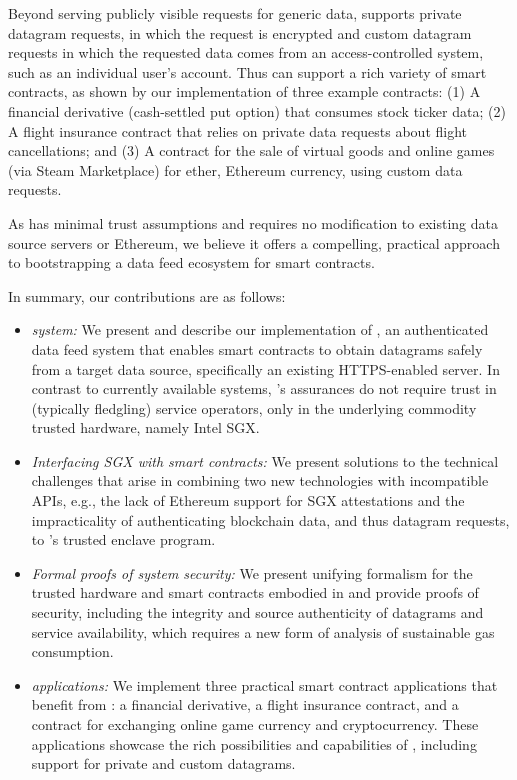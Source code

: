 Beyond serving publicly visible requests for generic data, \tc supports private datagram requests, in which the request is encrypted and custom datagram requests in which the requested data comes from an access-controlled system, such as an individual user's account. Thus \tc can support a rich variety of smart contracts, as shown by our implementation of three example contracts: (1) A financial derivative (cash-settled put option) that consumes stock ticker data; (2) A flight insurance contract that relies on private data requests about flight cancellations; and (3) A contract for the sale of virtual goods and online games (via Steam Marketplace) for ether, Ethereum currency, using custom data requests.

As \tc has minimal trust assumptions and requires no modification to existing data source servers or Ethereum, we believe it offers a compelling, practical approach to bootstrapping a data feed ecosystem for smart contracts. 
 
In summary, our contributions are as follows:

\vspace{-1mm}
\begin{itemize}
  \setlength{\itemsep}{2pt}
  \setlength{\parskip}{0pt}
  \setlength{\parsep}{0pt}

\item \emph{\tcs system:} We present and describe our implementation of \tc, an authenticated data feed system that enables smart contracts to obtain datagrams safely from a target data source, specifically an existing HTTPS-enabled server. In contrast to currently available systems, \tc's assurances do not require trust in (typically fledgling) service operators, only in the underlying commodity trusted hardware, namely Intel SGX. 

\item \emph{Interfacing SGX with smart contracts:} We present solutions to the technical challenges that arise in combining two new technologies with incompatible APIs, e.g., the lack of Ethereum support for SGX attestations and the impracticality of authenticating blockchain data, and thus datagram requests, to \tc's trusted enclave program. 

\item \emph{Formal proofs of \tc system security:} We present unifying formalism for the trusted hardware and smart contracts embodied in \tc and provide proofs of security, including the integrity and source authenticity of datagrams and service availability, which requires a new form of analysis of sustainable gas consumption. 

\item \emph{\tc applications:} We implement three practical smart contract applications that benefit from \tc: a financial derivative, a flight insurance contract, and a contract for exchanging online game currency and cryptocurrency. These applications showcase the rich possibilities and capabilities of \tc, including support for private and custom datagrams. 

\end{itemize}

